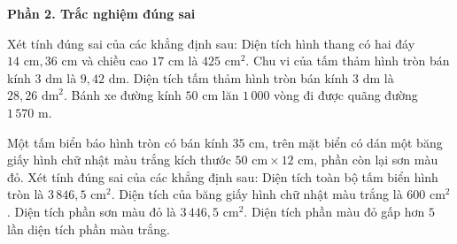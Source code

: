 \textbf{Phần 2. Trắc nghiệm đúng sai}

\begin{ex} %
Xét tính đúng sai của các khẳng định sau:
\choiceTF
{\True Diện tích hình thang có hai đáy $14\text{ cm}, 36\text{ cm}$ và chiều cao $17\text{ cm}$ là $425\text{ cm}^2$.}
{Chu vi của tấm thảm hình tròn bán kính $3\text{ dm}$ là $9{,}42\text{ dm}$.}
{\True Diện tích tấm thảm hình tròn bán kính $3\text{ dm}$ là $28{,}26\text{ dm}^2$.}
{\True Bánh xe đường kính $50\text{ cm}$ lăn $1\,000$ vòng đi được quãng đường $1\,570\text{ m}$.}
\end{ex}

\begin{ex} %
Một tấm biển báo hình tròn có bán kính $35\text{ cm}$, trên mặt biển có dán một băng giấy hình chữ nhật màu trắng kích thước $50\text{ cm} \times 12\text{ cm}$, phần còn lại sơn màu đỏ. Xét tính đúng sai của các khẳng định sau:
\choiceTF
{\True Diện tích toàn bộ tấm biển hình tròn là $3\,846{,}5\text{ cm}^2$.}
{\True Diện tích của băng giấy hình chữ nhật màu trắng là $600\text{ cm}^2$.}
{Diện tích phần sơn màu đỏ là $3\,446{,}5\text{ cm}^2$.}
{\True Diện tích phần màu đỏ gấp hơn $5$ lần diện tích phần màu trắng.}
\end{ex}

